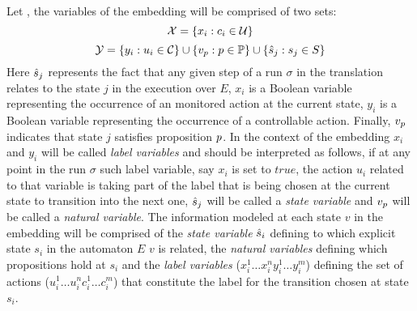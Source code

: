 %
Let \cltsDef, the variables of the embedding will be comprised of two sets:
\[{\mathcal{X}} = \{x_i : c_i \in \mathcal{U} \}\]
\[{\mathcal{Y}} = \{y_i : u_i \in \mathcal{C} \} \cup \{v_{p} : p \in \mathbb{P}\} \cup \{\hat{s}_{j} : s_j \in S \}\]
Here $\hat{s}_{j}$ represents the fact that any given step of a run $\sigma$ in the translation relates to the state $j$ in the execution \execution over $E$, $x_i$ is a Boolean variable representing the occurrence of an monitored action at the current state, $y_i$ is a Boolean variable representing the occurrence of a controllable action. Finally, $v_{p}$ indicates that state $j$ satisfies proposition $p$. In the context of the embedding $x_i$ and $y_i$ will be called \emph{label variables} and should be interpreted as follows, if at any point in the run $\sigma$ such label variable, say $x_i$ is set to $true$, the action $u_i$ related to that variable is taking part of the label that is being chosen at the current state to transition into the next one, $\hat{s}_{j}$ will be called a \emph{state variable} and $v_{p}$ will be called a \emph{natural variable}. The information modeled at each state $v$ in the embedding \fdsEmbedding will be comprised of the \emph{state variable} $\hat{s}_{i}$ defining to which explicit state $s_i$ in the automaton $E$ $v$ is related, the \emph{natural variables} defining which propositions hold at $s_i$ and the \emph{label variables} ($x_i^1\ldots x_i^n y_i^1\ldots y_i^m$) defining the set of actions ($u_i^1\ldots u_i^n c_i^1\ldots c_i^m$) that constitute the label for the transition chosen at state $s_i$.

